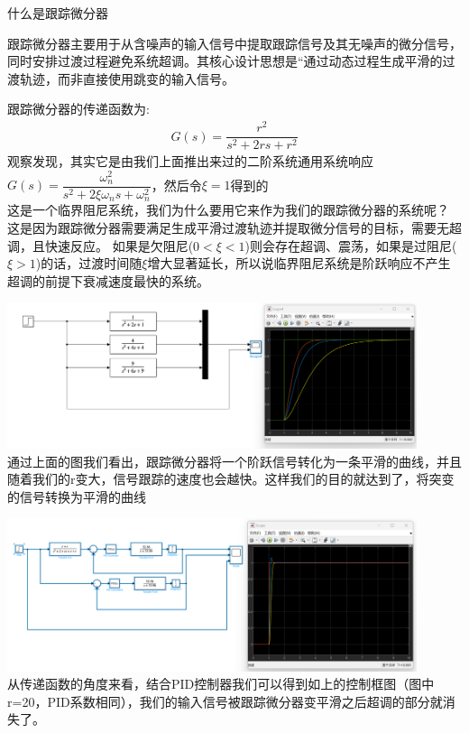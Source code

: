 \documentclass[UTF8,a4paper,12pt]{ctexart}
\begin{document}
           \begin{titlebox}{什么是跟踪微分器}
            \begin{flushleft}
              跟踪微分器主要用于从含噪声的输入信号中提取跟踪信号及其无噪声的微分信号，同时安排过渡过程避免系统超调。其核心设计思想是“通过动态过程生成平滑的过渡轨迹，而非直接使用跳变的输入信号。
              
            \end{flushleft}
          \end{titlebox}
          \begin{flushleft}
            跟踪微分器的传递函数为:
            \begin{align*}
             G(s) = \dfrac{r^{2}}{s^2+2rs+r^{2}}
            \end{align*}
            观察发现，其实它是由我们上面推出来过的二阶系统通用系统响应$G(s)=\dfrac{\omega _{n}^{2}}{s^2+2\xi \omega _ns+\omega _{n}^{2}}$，然后令$\xi=1$得到的\\
              
            
            这是一个临界阻尼系统，我们为什么要用它来作为我们的跟踪微分器的系统呢？
            \\这是因为跟踪微分器需要满足生成平滑过渡轨迹并提取微分信号的目标，需要无超调，且快速反应。
            如果是欠阻尼($0<\xi<1$)则会存在超调、震荡，如果是过阻尼($\xi>1$)的话，过渡时间随$\xi$增大显著延长，所以说临界阻尼系统是阶跃响应不产生超调的前提下衰减速度最快的系统。
            \par \includegraphics[width=12cm]{picture/tracking_differentiator.png}\\
            通过上面的图我们看出，跟踪微分器将一个阶跃信号转化为一条平滑的曲线，并且随着我们的r变大，信号跟踪的速度也会越快。这样我们的目的就达到了，将突变的信号转换为平滑的曲线

          \end{flushleft}
             \begin{flushleft}
              
            \par \includegraphics[width=12cm]{picture/tracking_differentiator_pid.png}\\
            从传递函数的角度来看，结合PID控制器我们可以得到如上的控制框图（图中r=20，PID系数相同），我们的输入信号被跟踪微分器变平滑之后超调的部分就消失了。
            \end{flushleft}
\end{document}
